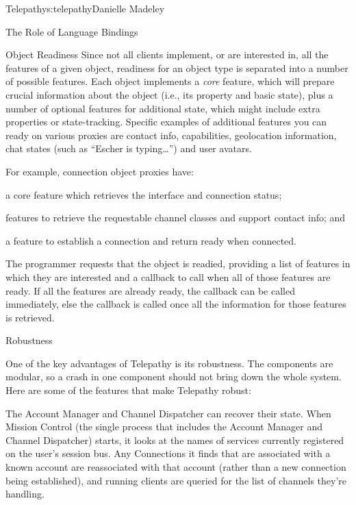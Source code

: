 \begin{aosachapter}{Telepathy}{s:telepathy}{Danielle Madeley}
\begin{aosasect1}{The Role of Language Bindings}
\begin{aosasect2}{Object Readiness}
Since not all clients implement, or are interested in, all the
features of a given object, readiness for an object type is separated
into a number of possible features.  Each object implements a
\emph{core} feature, which will prepare crucial information about the
object (i.e., its  property and basic state), plus a
number of optional features for additional state, which might include
extra properties or state-tracking.  Specific examples of additional
features you can ready on various proxies are contact info,
capabilities, geolocation information, chat states (such as ``Escher
is typing{\ldots}'') and user avatars.

For example, connection object proxies have:

\begin{aosaitemize}

  \item a core feature which retrieves the interface and connection
    status;

  \item features to retrieve the requestable channel classes and
    support contact info; and

  \item a feature to establish a connection and return ready when
    connected.

\end{aosaitemize}

The programmer requests that the object is readied, providing a list
of features in which they are interested and a callback to call when
all of those features are ready. If all the features are already
ready, the callback can be called immediately, else the callback is
called once all the information for those features is retrieved.

\end{aosasect2}

\end{aosasect1}

\begin{aosasect1}{Robustness}

One of the key advantages of Telepathy is its robustness. The
components are modular, so a crash in one component should not bring
down the whole system.  Here are some of the features that make
Telepathy robust:

\begin{aosaitemize}

  \item The Account Manager and Channel Dispatcher can recover their
    state.  When Mission Control (the single process that includes the
    Account Manager and Channel Dispatcher) starts, it looks at the
    names of services currently registered on the user's session bus.
    Any Connections it finds that are associated with a known account
    are reassociated with that account (rather than a new connection
    being established), and running clients are queried for the list
    of channels they're handling.


\end{aosaitemize}
\end{aosasect1}
\end{aosachapter}
